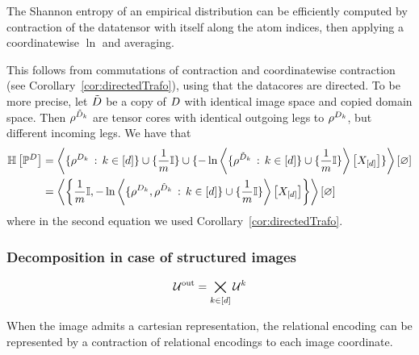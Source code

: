 \begin{example}
	The Shannon entropy of an empirical distribution can be efficiently computed by contraction of the datatensor with itself along the atom indices, then applying a coordinatewise $\ln$ and averaging.

	This follows from commutations of contraction and coordinatewise contraction (see Corollary~\ref{cor:directedTrafo}), using that the datacores are directed. 
	To be more precise, let $\tilde{D}$ be a copy of $D$ with identical image space and copied domain space.
	Then $\rho^{\tilde{D}_{k}}$ are tensor cores with identical outgoing legs to $\rho^{D_{k}}$, but different incoming legs.
	We have that
	\begin{align*}
		\mathbb{H}\left[\mathbb{P}^{D}\right] 
		& = \left\langle \{\rho^{D_{k}}\, : \, k\in[d]\} \cup \{\frac{1}{m}\mathbb{I} \} \cup \{-\ln \left\langle \{\rho^{\tilde{D}_{k}}\, : \, k\in[d]\} \cup \{\frac{1}{m}\mathbb{I} \}\right\rangle \left[ X_{[d]} \right] \} \right\rangle \left[ \varnothing \right] \\
		& = \left\langle 
		 \left\{\frac{1}{m}\mathbb{I}, -\ln \left\langle \{\rho^{D_{k}},\rho^{\tilde{D}_{k}}\, : \, k\in[d]\} \cup \{\frac{1}{m}\mathbb{I} \}\right\rangle \left[ X_{[d]} \right] \right\}
		\right\rangle \left[ \varnothing \right]
	\end{align*}
	where in the second equation we used Corollary~\ref{cor:directedTrafo}.
\end{example}

\subsubsection{Decomposition in case of structured images}

	\[ \mathcal{U}^{\mathrm{out}} = \bigtimes_{k\in[d]} \mathcal{U}^{k}\]


When the image admits a cartesian representation, the relational encoding can be represented by a contraction of relational encodings to each image coordinate.

